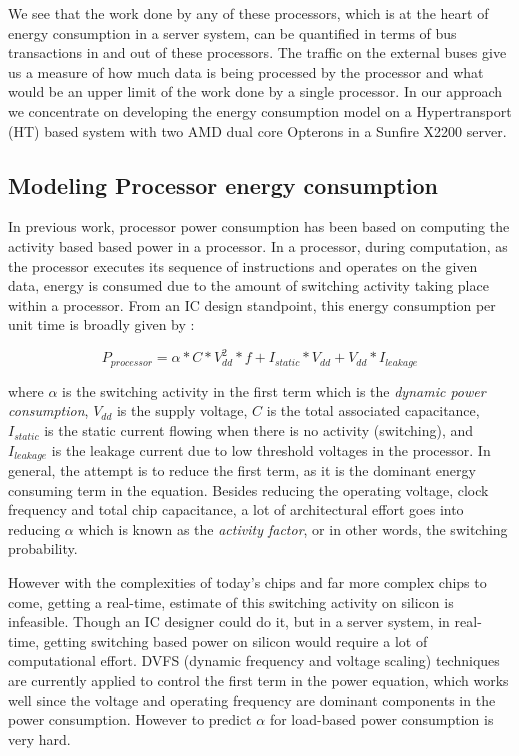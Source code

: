 \documentclass[times, 10pt,onecolumn]{article}
\begin{document}
We see that the work done by any of these processors, which is at the
heart of energy consumption in a server system, can be quantified in
terms of bus transactions in and out of these processors.  The traffic
on the external buses give us a measure of how much data is being
processed by the processor and what would be an upper limit of the work
done by a single processor. In our approach we concentrate on developing
the energy consumption model on a Hypertransport (HT) based system with
two AMD dual core Opterons in a Sunfire X2200 server.

\subsection{Modeling Processor energy consumption}
\label{sec:procmodel}

In previous work, processor power consumption has been based on
computing the activity based based power in a processor.  In a
processor, during computation, as the processor executes its sequence of
instructions and operates on the given data, energy is consumed due to
the amount of switching activity taking place within a processor. From
an IC design standpoint, this energy consumption per unit time is
broadly given by :

\begin{equation}
\label{eq:power_proc}
P_{processor}=  \alpha*C*V_{dd}^2*f + I_{static}*V_{dd} + V_{dd}*I_{leakage}
\end{equation}

where $\alpha$ is the switching activity in the first term which is the
\emph{dynamic power consumption}, $V_{dd}$ is the supply voltage, $C$ is
the total associated capacitance, $I_{static}$ is the static current
flowing when there is no activity (switching), and $I_{leakage}$ is the
leakage current due to low threshold voltages in the processor. In
general, the attempt is to reduce the first term, as it is the dominant
energy consuming term in the equation. Besides reducing the operating
voltage, clock frequency and total chip capacitance, a lot of
architectural effort goes into reducing $\alpha$ which is known as the
\emph{activity factor}, or in other words, the switching probability.

However with the complexities of today's chips and far more complex
chips to come, getting a real-time, estimate of this switching activity
on silicon is infeasible. Though an IC designer could do it, but in a
server system, in real-time, getting switching based power on silicon
would require a lot of computational effort. DVFS (dynamic frequency and
voltage scaling) techniques are currently applied to control the first
term in the power equation, which works well since the voltage and
operating frequency are dominant components in the power
consumption. However to predict $\alpha$ for load-based power
consumption is very hard.
\end{document}
